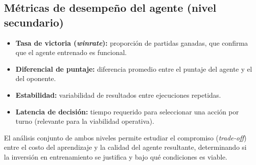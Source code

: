 \subsection{Métricas de desempeño del agente (nivel secundario)}

\begin{itemize}
    \item \textbf{Tasa de victoria (\textit{winrate}):} proporción de partidas ganadas, que confirma que el agente entrenado es funcional.
    \item \textbf{Diferencial de puntaje:} diferencia promedio entre el puntaje del agente y el del oponente.
    \item \textbf{Estabilidad:} variabilidad de resultados entre ejecuciones repetidas.
    \item \textbf{Latencia de decisión:} tiempo requerido para seleccionar una acción por turno (relevante para la viabilidad operativa).
\end{itemize}

El análisis conjunto de ambos niveles permite estudiar el compromiso (\textit{trade-off}) entre el costo del aprendizaje y la calidad del agente resultante, determinando si la inversión en entrenamiento se justifica y bajo qué condiciones es viable.

